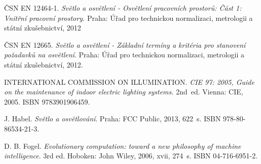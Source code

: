 \documentclass[Afour,sagev,times,doublespace]{sagej}
\begin{document}
\begin{thebibliography}{99}

\v{C}SN EN 12464-1. \textit{Sv\v{e}tlo a osv\v{e}tlen\'{i} - Osv\v{e}tlen\'{i} pracovn\'{i}ch prostor\r{u}: \v{C}\'{a}st 1: Vnit\v{r}n\'{i} pracovn\'{i} prostory.} Praha: \'{U}\v{r}ad pro technickou normalizaci, metrologii a st\'{a}tn\'{i} zku\v{s}ebnictv\'{i}, 2012

\v{C}SN EN 12665. \textit{Sv\v{e}tlo a osv\v{e}tlen\'{i} - Z\'{a}kladn\'{i} term\'{i}ny a krit\'{e}ria pro stanoven\'{i} po\v{z}adavk\r{u} na osv\v{e}tlen\'{i}}. Praha: \'{U}\v{r}ad pro technickou normalizaci, metrologii a st\'{a}tn\'{i} zku\v{s}ebnictv\'{i}, 2012.

INTERNATIONAL COMMISSION ON ILLUMINATION.\textit{ CIE 97: 2005, Guide on the maintenance of indoor electric lighting systems.} 2nd~ed. Vienna: CIE, 2005. ISBN 9783901906459.

J. Habel. \textit{Sv\v{e}tlo a osv\v{e}tlov\'{a}n\'{i}}. Praha: FCC Public, 2013, 622~s. ISBN 978-80-86534-21-3.

D. B. Fogel. \textit{Evolutionary computation: toward a new philosophy of machine intelligence}. 3rd ed. Hoboken: John Wiley, 2006, xvii, 274~s. ISBN 04-716-6951-2.

\end{thebibliography}
\end{document}
